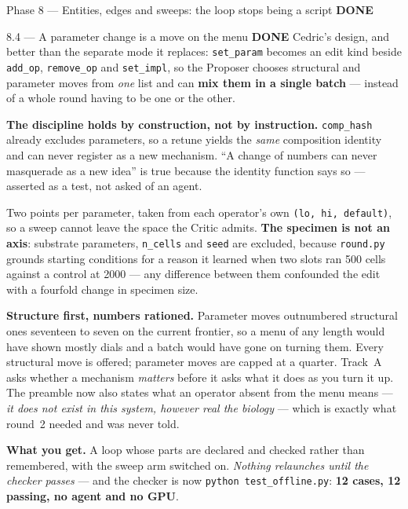 \documentclass[11pt,a4paper]{article}
\newcommand{\code}[1]{\texttt{#1}}
\newcommand{\done}{\textcolor{good}{\textbf{DONE}}}
\begin{document}
\begin{phasebox}{Phase 8 --- Entities, edges and sweeps: the loop stops being a script \hfill \done}
\begin{resultbox}{8.4 --- A parameter change is a move on the menu \hfill \done}
Cedric's design, and better than the separate mode it replaces: \code{set\_param} becomes an edit
kind beside \code{add\_op}, \code{remove\_op} and \code{set\_impl}, so the Proposer chooses
structural and parameter moves from \emph{one} list and can \textbf{mix them in a single batch} ---
instead of a whole round having to be one or the other.

\smallskip
\textbf{The discipline holds by construction, not by instruction.} \code{comp\_hash} already
excludes parameters, so a retune yields the \emph{same} composition identity and can never register
as a new mechanism. ``A change of numbers can never masquerade as a new idea'' is true because the
identity function says so --- asserted as a test, not asked of an agent.

\smallskip
Two points per parameter, taken from each operator's own \code{(lo, hi, default)}, so a sweep cannot
leave the space the Critic admits. \textbf{The specimen is not an axis}: substrate parameters,
\code{n\_cells} and \code{seed} are excluded, because \code{round.py} grounds starting conditions
for a reason it learned when two slots ran 500 cells against a control at 2000 --- any difference
between them confounded the edit with a fourfold change in specimen size.

\smallskip
\textbf{Structure first, numbers rationed.} Parameter moves outnumbered structural ones seventeen to
seven on the current frontier, so a menu of any length would have shown mostly dials and a batch
would have gone on turning them. Every structural move is offered; parameter moves are capped at a
quarter. Track~A asks whether a mechanism \emph{matters} before it asks what it does as you turn it
up. The preamble now also states what an operator absent from the menu means --- \emph{it does not
exist in this system, however real the biology} --- which is exactly what round~2 needed and was
never told.
\end{resultbox}

\textbf{What you get.} A loop whose parts are declared and checked rather than remembered, with
the sweep arm switched on. \emph{Nothing relaunches until the checker passes} --- and the checker is
now \code{python test\_offline.py}: \textbf{12 cases, 12 passing, no agent and no GPU}.
\end{phasebox}
\end{document}

